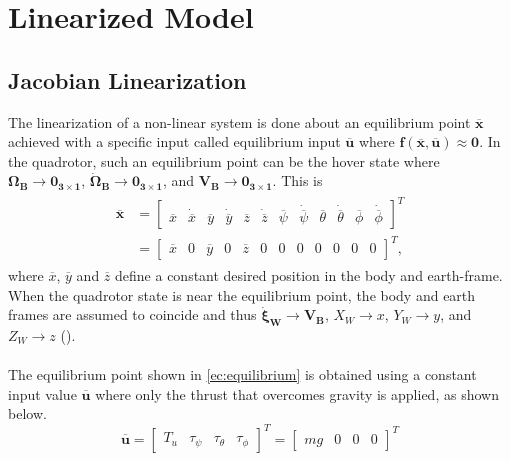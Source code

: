 \section{Linearized Model}
\label{sec:linearized}
\setcounter{MaxMatrixCols}{20}
\subsection{Jacobian Linearization}
The linearization of a non-linear system is done about an equilibrium point $\overline{\mathbf{x}}$ achieved with a specific input called equilibrium input $\overline{\mathbf{u}}$  where $\mathbf{f(\overline{x},\overline{u})} \approx \mathbf{0}$. In the quadrotor, such an equilibrium point can be the hover state where $\mathbf{\Omega_B} \to \mathbf{0_{3\times 1}}$, $\mathbf{\dot{\Omega}_B} \to \mathbf{0_{3\times 1}}$, and $\mathbf{V_{B}} \to \mathbf{0_{3\times 1}}$. This is
\begin{align}
\label{ec:equilibrium}
\begin{split}
\overline{\mathbf{x}} & = \begin{bmatrix}
\overline{x} & \dot{\overline{x}} & \overline{y} & \dot{\overline{y}} & \overline{z} & \dot{\overline{z}} & \overline{\psi} & \dot{\overline{\psi}} & \overline{\theta} & \dot{\overline{\theta}} & \overline{\phi} & \dot{\overline{\phi}}
\end{bmatrix}^{T}\\
 & = \begin{bmatrix}
\overline{x} & 0 & \overline{y} & 0 & \overline{z} & 0 & 0 & 0 & 0 & 0 & 0 & 0
\end{bmatrix}^{T},
\end{split}
\end{align}
where $\overline{x}$, $\overline{y}$ and $\overline{z}$ define a constant desired position in the body and earth-frame. When the quadrotor state is near the equilibrium point, the body and earth frames are assumed to coincide and thus $\mathbf{\dot{\xi}_W}\to \mathbf{V_{B}}$, $X_W \to x$, $Y_W \to y$, and $Z_W \to z$ (\cite{Sabatino2015}).\\\\
The equilibrium point shown in \ref{ec:equilibrium} is obtained using a constant input value $\overline{\mathbf{u}}$ where only the thrust that overcomes gravity is applied, as shown below.
\begin{equation}
\overline{\mathbf{u}} = \begin{bmatrix}
T_u & \tau_\psi & \tau_\theta & \tau_\phi
\end{bmatrix}^{T} = \begin{bmatrix}
mg & 0 & 0 & 0
\end{bmatrix}^{T}
\end{equation}
